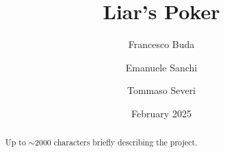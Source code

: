 \documentclass{scrartcl}
\title{\LARGE
    Liar's Poker
}
\author{
    Francesco Buda \\ \emailaddr{francesco.buda3@studio.unibo.it}
    \and
    Emanuele Sanchi \\ \emailaddr{emanuele.sanchi@studio.unibo.it}
    \and
    Tommaso Severi \\ \emailaddr{tommaso.severi2@studio.unibo.it}
}
\date{February 2025}
\begin{document}
\maketitle

\begin{abstract}
      Up to $\sim$2000 characters briefly describing the project.
\end{abstract}

\clearpage

\tableofcontents

\clearpage

\end{document}
